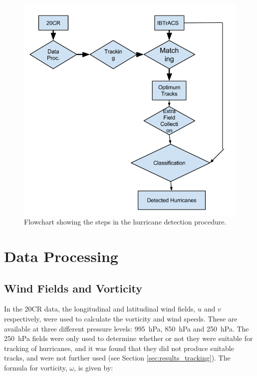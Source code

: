 \documentclass[pdftex,12pt,a4paper]{report}
\begin{document}
\begin{figure}[hbp]
    \centering
    \includegraphics[width=\textwidth]{figures/hurricane_detection_procedure}
    \caption{Flowchart showing the steps in the hurricane detection procedure.}
    \label{fig:hurricane_detection_proc}
\end{figure}



\section{Data Processing}

\subsection{Wind Fields and Vorticity}

In the 20CR data, the longitudinal and latitudinal wind fields, $u$ and $v$ respectively, were used
to calculate the vorticity and wind speeds. These are available at three different pressure levels:
\SI{995}{hPa}, \SI{850}{hPa} and \SI{250}{hPa}. The \SI{250}{hPa} fields were only used to determine
whether or not they were suitable for tracking of hurricanes, and it was found that they did not
produce suitable tracks, and were not further used (see Section \ref{sec:results_tracking}). The
formula for vorticity, $\omega$, is given by:
\end{document}
